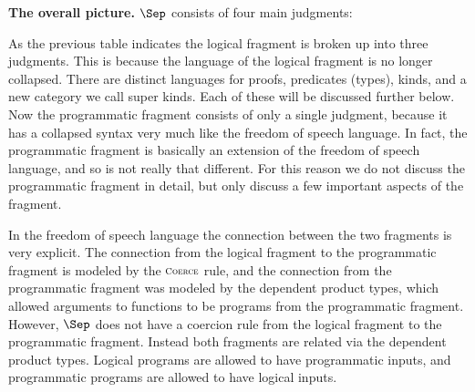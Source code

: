 \textbf{The overall picture.}  $\Sep$ consists of four main judgments:
\begin{center}
\end{center}
As the previous table indicates the logical fragment is broken up into
three judgments.  This is because the language of the logical fragment
is no longer collapsed.  There are distinct languages for proofs,
predicates (types), kinds, and a new category we call super kinds.
Each of these will be discussed further below.  Now the programmatic
fragment consists of only a single judgment, because it has a
collapsed syntax very much like the freedom of speech language.  In
fact, the programmatic fragment is basically an extension of the
freedom of speech language, and so is not really that different. For
this reason we do not discuss the programmatic fragment in detail, but
only discuss a few important aspects of the fragment.  

In the freedom of speech language the connection between the two
fragments is very explicit.  The connection from the logical fragment
to the programmatic fragment is modeled by the $\scriptsize \textsc{Coerce}$
rule, and the connection from the programmatic fragment was modeled by
the dependent product types, which allowed arguments to functions to be
programs from the programmatic fragment.  However, $\Sep$ does not
have a coercion rule from the logical fragment to the programmatic
fragment.  Instead both fragments are related via the dependent
product types.  Logical programs are allowed to have programmatic
inputs, and programmatic programs are allowed to have logical
inputs.  

